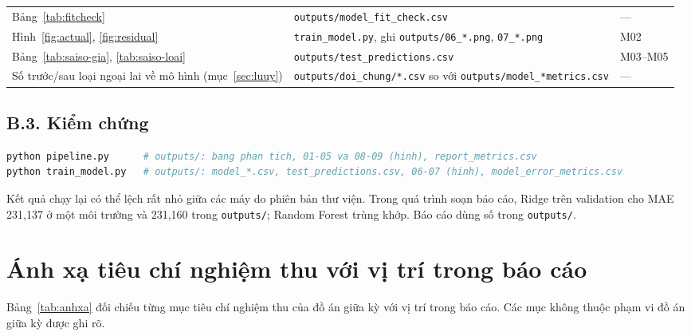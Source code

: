 \begin{longtable}{@{}L{4.2cm} L{5.8cm} L{4.0cm}@{}}
Bảng~\ref{tab:fitcheck} & \texttt{outputs/model\_fit\_check.csv} & --- \\
Hình~\ref{fig:actual}, \ref{fig:residual} & \texttt{train\_model.py}, ghi \texttt{outputs/06\_*.png}, \texttt{07\_*.png} & M02 \\
Bảng~\ref{tab:saiso-gia}, \ref{tab:saiso-loai} & \texttt{outputs/test\_predictions.csv} & M03--M05 \\
Số trước/sau loại ngoại lai về mô hình (mục~\ref{sec:luuy}) & \texttt{outputs/doi\_chung/*.csv} so với \texttt{outputs/model\_*metrics.csv} & --- \\
\end{longtable}

\section*{B.3. Kiểm chứng}
\begin{lstlisting}[language=bash]
python pipeline.py      # outputs/: bang phan tich, 01-05 va 08-09 (hinh), report_metrics.csv
python train_model.py   # outputs/: model_*.csv, test_predictions.csv, 06-07 (hinh), model_error_metrics.csv
\end{lstlisting}
Kết quả chạy lại có thể lệch rất nhỏ giữa các máy do phiên bản thư viện. Trong quá trình soạn báo cáo, Ridge trên validation cho MAE 231,137 ở một môi trường và 231,160 trong \texttt{outputs/}; Random Forest trùng khớp. Báo cáo dùng số trong \texttt{outputs/}.


\chapter{Ánh xạ tiêu chí nghiệm thu với vị trí trong báo cáo}\label{pl:anhxa}

Bảng~\ref{tab:anhxa} đối chiếu từng mục tiêu chí nghiệm thu của đồ án giữa kỳ với vị trí trong báo cáo. Các mục không thuộc phạm vi đồ án giữa kỳ được ghi rõ.

